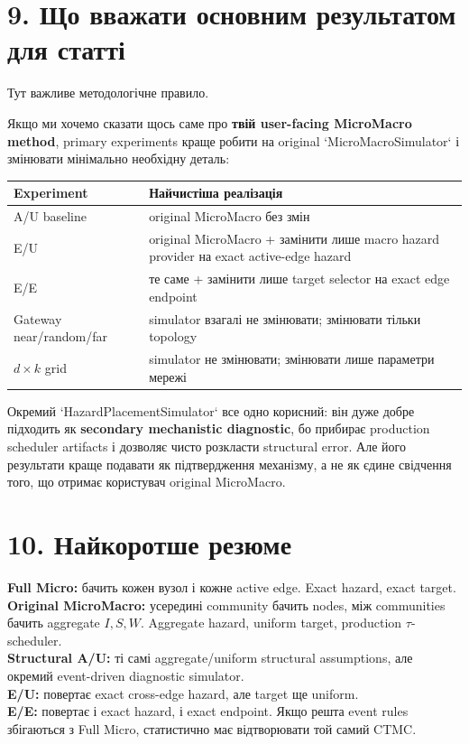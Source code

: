 \documentclass[11pt,a4paper]{article}
\begin{document}
\section*{9. Що вважати основним результатом для статті}

Тут важливе методологічне правило.

Якщо ми хочемо сказати щось саме про \textbf{твій user-facing MicroMacro method}, primary experiments краще робити на original `MicroMacroSimulator` і змінювати мінімально необхідну деталь:

\begin{center}
\begin{tabular}{p{35mm} p{107mm}}
\toprule
\textbf{Experiment} & \textbf{Найчистіша реалізація}\\
\midrule
A/U baseline & original MicroMacro без змін\\
E/U & original MicroMacro + замінити лише macro hazard provider на exact active-edge hazard\\
E/E & те саме + замінити лише target selector на exact edge endpoint\\
Gateway near/random/far & simulator взагалі не змінювати; змінювати тільки topology\\
$d\times k$ grid & simulator не змінювати; змінювати лише параметри мережі\\
\bottomrule
\end{tabular}
\end{center}

Окремий `HazardPlacementSimulator` все одно корисний: він дуже добре підходить як \textbf{secondary mechanistic diagnostic}, бо прибирає production scheduler artifacts і дозволяє чисто розкласти structural error. Але його результати краще подавати як підтвердження механізму, а не як єдине свідчення того, що отримає користувач original MicroMacro.

\section*{10. Найкоротше резюме}

\begin{tcolorbox}[colback=soft,colframe=dark]
\textbf{Full Micro:} бачить кожен вузол і кожне active edge. Exact hazard, exact target.\\[3pt]
\textbf{Original MicroMacro:} усередині community бачить nodes, між communities бачить aggregate $I,S,W$. Aggregate hazard, uniform target, production $\tau$-scheduler.\\[3pt]
\textbf{Structural A/U:} ті самі aggregate/uniform structural assumptions, але окремий event-driven diagnostic simulator.\\[3pt]
\textbf{E/U:} повертає exact cross-edge hazard, але target ще uniform.\\[3pt]
\textbf{E/E:} повертає і exact hazard, і exact endpoint. Якщо решта event rules збігаються з Full Micro, статистично має відтворювати той самий CTMC.
\end{tcolorbox}
\end{document}
